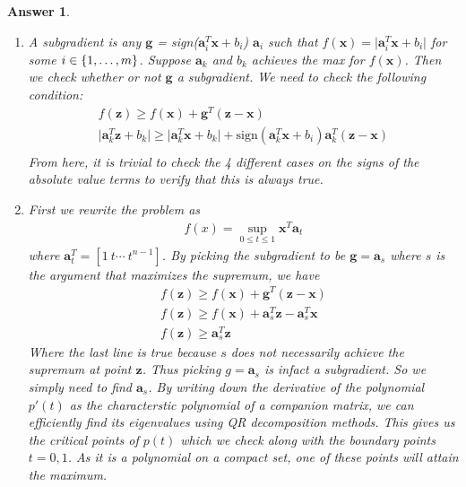 \documentclass[12pt]{article}
\theoremstyle{colon}
\newtheorem*{answer}{Answer}
\begin{document}
\begin{answer}
  \

  \begin{enumerate}[label=\alph*)]
    \item A subgradient is any $\bm{g}$ = sign($\bm{a}_i^T \bm{x} + b_i$) $\bm{a}_i$ such that $f(\bm{x}) = \lvert \bm{a}_i^T \bm{x} + b_i \rvert$ for some $i \in \{1, \mathellipsis, m\}$. Suppose $\bm{a}_k$ and $b_k$ achieves the max for $f(\bm{x})$. Then we check whether or not $\bm{g}$ a subgradient. We need to check the following condition:
      \begin{gather*}
        f(\bm{z}) \geq f(\bm{x}) + \bm{g}^T (\bm{z} - \bm{x}) \\
        \lvert \bm{a}_k^T \bm{z} + b_k \rvert \geq \lvert \bm{a}_k^T \bm{x} + b_k \rvert + \text{sign}(\bm{a}_k^T \bm{x} + b_i)\bm{a}_k^T(\bm{z} - \bm{x}) \\
      \end{gather*}
      From here, it is trivial to check the 4 different cases on the signs of the absolute value terms to verify that this is always true.

    \item First we rewrite the problem as
      \begin{gather*}
        f(x) = \sup_{0 \leq t \leq 1} \bm{x}^T \bm{a}_t
      \end{gather*}
      where $\bm{a}_t^T = [1 \ t \cdots \ t^{n-1}]$. By picking the subgradient to be $\bm{g} = \bm{a}_s$ where $s$ is the argument that maximizes the supremum, we have
      \begin{gather*}
        f(\bm{z}) \geq f(\bm{x}) + \bm{g}^T (\bm{z} - \bm{x}) \\
        f(\bm{z}) \geq f(\bm{x}) + \bm{a}_s^T\bm{z} - \bm{a}_s^T \bm{x} \\
        f(\bm{z}) \geq \bm{a}_s^T \bm{z}
      \end{gather*}
      Where the last line is true because $s$ does not necessarily achieve the supremum at point $\bm{z}$. Thus picking $g = \bm{a}_s$ is infact a subgradient. So we simply need to find $\bm{a}_s$. By writing down the derivative of the polynomial $p'(t)$ as the characterstic polynomial of a companion matrix, we can efficiently find its eigenvalues using QR decomposition methods. This gives us the critical points of $p(t)$ which we check along with the boundary points $t = 0,1$. As it is a polynomial on a compact set, one of these points will attain the maximum.


\end{enumerate}
\end{answer}
\end{document}
